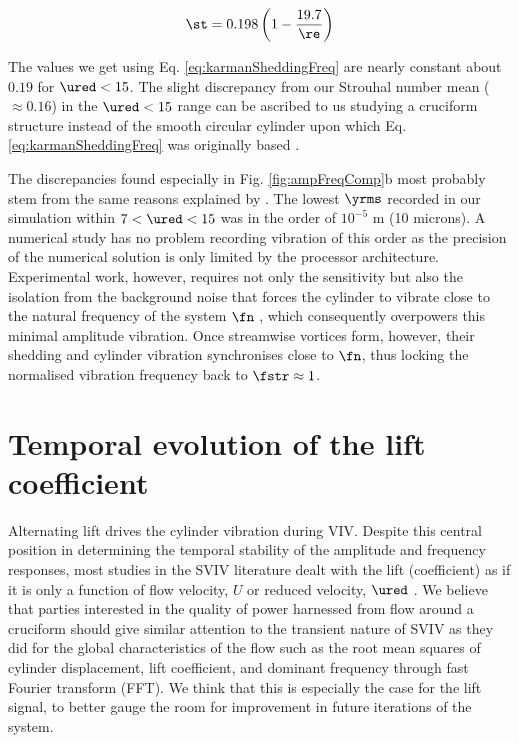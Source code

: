 \documentclass[a4paper,fleqn]{cas-sc}
\begin{document}
\begin{equation}
  \st = 0.198 \left( 1 - \frac{19.7}{\re} \right)
  \label{eq:karmanSheddingFreq}
\end{equation}

The values we get using Eq. \ref{eq:karmanSheddingFreq} are nearly constant about $0.19$ for  $\ured < 15$. The slight discrepancy from our Strouhal number mean ( $\approx 0.16$) in the   $\ured < 15$ range can be ascribed to us studying a cruciform structure instead of the smooth circular cylinder upon which Eq. \ref{eq:karmanSheddingFreq} was originally based \citep{Blevins1990}.

The discrepancies found especially in Fig. \ref{fig:ampFreqComp}b most probably stem from the same reasons explained by \citet{Nguyen2012}. The lowest  $\yrms$ recorded in our simulation within  $7 < \ured < 15$ was in the order of $10^{-5}$ \si{\metre} (10 microns). A numerical study has no problem recording vibration of this order as the precision of the numerical solution is only limited by the processor architecture. Experimental work, however, requires not only the sensitivity but also the isolation from the background noise that forces the cylinder to vibrate close to the natural frequency of the system  $\fn$ \citep{Nguyen2012}, which consequently overpowers this minimal amplitude vibration. Once streamwise vortices form, however, their shedding and cylinder vibration synchronises close to $\fn$, thus locking the normalised vibration frequency back to  $\fstr \approx 1$.


\section{Temporal evolution of the lift coefficient} \label{sec:tempEvo}
Alternating lift drives the cylinder vibration during VIV. Despite this central position in determining the temporal stability of the amplitude and frequency responses, most studies in the SVIV literature dealt with the lift (coefficient) as if it is only a function of flow velocity, $U$ or reduced velocity, $\ured$ \citep{Kawabata2013,Koide2013,Hemsuwan2018b}. We believe that parties interested in the quality of power harnessed from flow around a cruciform should give similar attention to the transient nature of SVIV as they did for the global characteristics of the flow such as the root mean squares of cylinder displacement, lift coefficient, and dominant frequency through fast Fourier transform (FFT). We think that this is especially the case for the lift signal, to better gauge the room for improvement in future iterations of the system.
\end{document}
